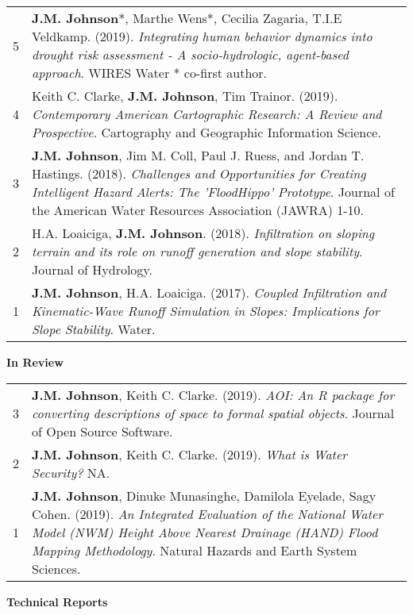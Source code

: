 \documentclass{article}
\newcommand{\header}[1]{\hspace{-5mm}\textcolor{header_blue}{\underline{\textbf{#1}}\\}} %
\newcommand{\subheader}[1]{\hspace{25mm}\textcolor{header_blue}{\textbf{#1}\\}} %
\newcommand{\me}{\textbf{J.M. Johnson}} %
\begin{document}
\begin{tabular}{rP{15.5cm}}
  5 & {\me}*, Marthe Wens*, Cecilia Zagaria, T.I.E Veldkamp. (2019). {\textit{Integrating human behavior dynamics into drought risk assessment - A socio-hydrologic, agent-based approach}. WIRES Water * co-first author.  } \\ 
  4 & Keith C. Clarke, {\me}, Tim Trainor. (2019). {\textit{Contemporary American Cartographic Research: A Review and Prospective}. Cartography and Geographic Information Science.  } \\ 
  3 & {\me}, Jim M. Coll, Paul J. Ruess, and Jordan T. Hastings. (2018). {\textit{Challenges and Opportunities for Creating Intelligent Hazard Alerts: The 'FloodHippo' Prototype}. Journal of the American Water Resources Association (JAWRA) 1-10.  } \\ 
  2 & H.A. Loaiciga, {\me}. (2018). {\textit{Infiltration on sloping terrain and its role on runoff generation and slope stability}. Journal of Hydrology.  } \\ 
  1 & {\me}, H.A. Loaiciga. (2017). {\textit{Coupled Infiltration and Kinematic-Wave Runoff Simulation in Slopes: Implications for Slope Stability}. Water.  } \\ 
  \end{tabular}
\vspace{5mm}
\newline
\subheader{In Review}

\begin{tabular}{rP{15.5cm}}
  3 & {\me}, Keith C. Clarke. (2019). {\textit{AOI: An R package for converting descriptions of space to formal spatial objects}. Journal of Open Source Software.  } \\ 
  2 & {\me}, Keith C. Clarke. (2019). {\textit{What is Water Security?} NA.  } \\ 
  1 & {\me}, Dinuke Munasinghe, Damilola Eyelade, Sagy Cohen. (2019). {\textit{An Integrated Evaluation of the National Water Model (NWM) Height Above Nearest Drainage (HAND) Flood Mapping Methodology}. Natural Hazards and Earth System Sciences.  } \\ 
  \end{tabular}
\vspace{5mm}
\newline
\subheader{Technical Reports}
\end{document}
